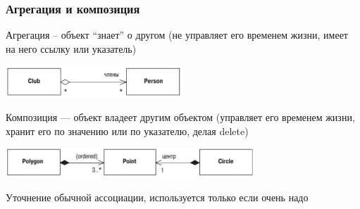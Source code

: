 \documentclass[xetex,mathserif,serif]{beamer}
\begin{document}
	\begin{frame}
		\frametitle{Агрегация и композиция}
		Агрегация – объект ``знает'' о другом (не управляет его временем жизни, имеет на него ссылку или указатель)
		\begin{center}
			\includegraphics[width=0.5\textwidth]{aggregations.png}
		\end{center}
		Композиция --- объект владеет другим объектом (управляет его временем жизни, хранит его по значению или по указателю, делая delete)
		\begin{center}
			\includegraphics[width=0.7\textwidth]{compositions.png}
		\end{center}
		Уточнение обычной ассоциации, используется только если очень надо
	\end{frame}
\end{document}
